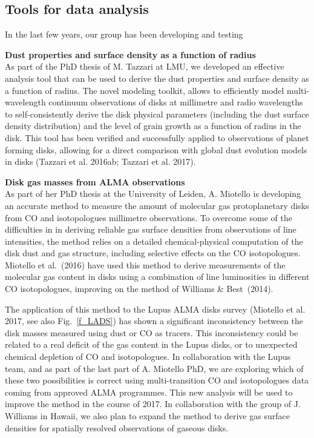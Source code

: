 \documentclass[10pt,fleqn,twoside]{article}
\newcommand{\Tcol}{\color{blue}}
\begin{document}
\subsection{\Tcol Tools for data analysis}
\label{s_tools}

In the last few years, our group has been developing and testing

{\bf Dust properties and surface density as a function of radius}\\
As part of the PhD thesis of M. Tazzari at LMU, we developed an effective analysis tool that can be used to derive the dust properties and surface density as a function of radius. The novel modeling toolkit, allows to efficiently model multi-wavelength continuum observations of disks at millimetre and radio wavelengths to self-consistently derive the disk physical parameters (including the dust surface density distribution) and the level of grain growth as a function of radius in the disk. This tool has been verified and successfully applied to observations of planet forming disks, allowing for a direct comparison with global dust evolution models in disks (Tazzari et al. 2016ab; Tazzari et al. 2017).  

{\bf Disk gas masses from ALMA observations}\\
As part of her PhD thesis at the University of Leiden, A. Miotello is developing an accurate method to measure the amount of molecular gas protoplanetary disks from CO and isotopologues millimetre observations. To overcome some of the difficulties in in deriving reliable gas surface densities from observations of line intensities, the method relies on a detailed chemical-physical computation of the disk dust and gas structure, including selective effects on the CO isotopologues. Miotello et al.~(2016) have used this method to derive measurements of the molecular gas content in disks using a combination of line luminosities in different CO isotopologues, improving on the method of Williams \& Best~(2014).

The application of this method to the Lupus ALMA disks survey (Miotello et al. 2017, see also Fig.~\ref{f_LADS}) has shown a significant inconsistency between the disk masses measured using dust or CO as tracers. This inconsistency could be related to a real deficit of the gas content in the Lupus disks, or to unexpected chemical depletion of CO and isotopologues. In collaboration with the Lupus team, and as part of the last part of A. Miotello PhD, we are exploring which of these two possibilities is correct using multi-transition CO and isotopologues data coming from approved ALMA programmes. This new analysis will be used to improve the method in the course of 2017. In collaboration with the group of J. Williams in Hawaii, we also plan to expand the method to derive gas surface densities for spatially resolved observations of gaseous disks.
\end{document}
